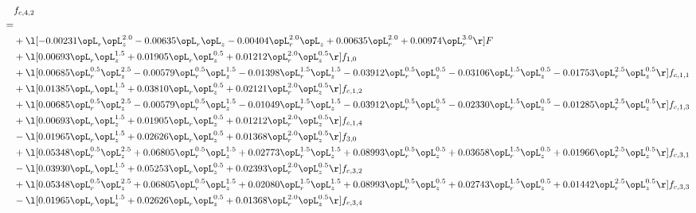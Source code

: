 \begin{alignat}{2} 
\label{eq:f_42_1} 
& f_{c,4,2} \nonumber \\ 
 = \\ 
& + \l[  -0.00231 \opL_r \opL_z^{2.0}   -0.00635 \opL_r \opL_z   -0.00404 \opL_r^{2.0} \opL_z +  0.00635 \opL_r^{2.0} +  0.00974 \opL_r^{3.0}  \r] F \nonumber \\ 
& + \l[  0.00693 \opL_r \opL_z^{1.5} +  0.01905 \opL_r \opL_z^{0.5} +  0.01212 \opL_r^{2.0} \opL_z^{0.5}  \r] f_{1,0} \nonumber \\ 
& + \l[  0.00685 \opL_r^{0.5} \opL_z^{2.5}   -0.00579 \opL_r^{0.5} \opL_z^{1.5}   -0.01398 \opL_r^{1.5} \opL_z^{1.5}   -0.03912 \opL_r^{0.5} \opL_z^{0.5}   -0.03106 \opL_r^{1.5} \opL_z^{0.5}   -0.01753 \opL_r^{2.5} \opL_z^{0.5}  \r] f_{c,1,1} \nonumber \\ 
& + \l[  0.01385 \opL_r \opL_z^{1.5} +  0.03810 \opL_r \opL_z^{0.5} +  0.02121 \opL_r^{2.0} \opL_z^{0.5}  \r] f_{c,1,2} \nonumber \\ 
& + \l[  0.00685 \opL_r^{0.5} \opL_z^{2.5}   -0.00579 \opL_r^{0.5} \opL_z^{1.5}   -0.01049 \opL_r^{1.5} \opL_z^{1.5}   -0.03912 \opL_r^{0.5} \opL_z^{0.5}   -0.02330 \opL_r^{1.5} \opL_z^{0.5}   -0.01285 \opL_r^{2.5} \opL_z^{0.5}  \r] f_{c,1,3} \nonumber \\ 
& + \l[  0.00693 \opL_r \opL_z^{1.5} +  0.01905 \opL_r \opL_z^{0.5} +  0.01212 \opL_r^{2.0} \opL_z^{0.5}  \r] f_{c,1,4} \nonumber \\ 
& - \l[  0.01965 \opL_r \opL_z^{1.5} +  0.02626 \opL_r \opL_z^{0.5} +  0.01368 \opL_r^{2.0} \opL_z^{0.5}  \r] f_{3,0} \nonumber \\ 
& + \l[  0.05348 \opL_r^{0.5} \opL_z^{2.5} +  0.06805 \opL_r^{0.5} \opL_z^{1.5} +  0.02773 \opL_r^{1.5} \opL_z^{1.5} +  0.08993 \opL_r^{0.5} \opL_z^{0.5} +  0.03658 \opL_r^{1.5} \opL_z^{0.5} +  0.01966 \opL_r^{2.5} \opL_z^{0.5}  \r] f_{c,3,1} \nonumber \\ 
& - \l[  0.03930 \opL_r \opL_z^{1.5} +  0.05253 \opL_r \opL_z^{0.5} +  0.02393 \opL_r^{2.0} \opL_z^{0.5}  \r] f_{c,3,2} \nonumber \\ 
& + \l[  0.05348 \opL_r^{0.5} \opL_z^{2.5} +  0.06805 \opL_r^{0.5} \opL_z^{1.5} +  0.02080 \opL_r^{1.5} \opL_z^{1.5} +  0.08993 \opL_r^{0.5} \opL_z^{0.5} +  0.02743 \opL_r^{1.5} \opL_z^{0.5} +  0.01442 \opL_r^{2.5} \opL_z^{0.5}  \r] f_{c,3,3} \nonumber \\ 
& - \l[  0.01965 \opL_r \opL_z^{1.5} +  0.02626 \opL_r \opL_z^{0.5} +  0.01368 \opL_r^{2.0} \opL_z^{0.5}  \r] f_{c,3,4} \nonumber \\ 

\end{alignat}
